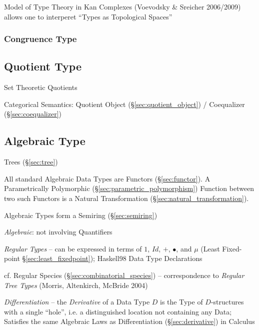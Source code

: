 Model of Type Theory in Kan Complexes (Voevodsky & Sreicher 2006/2009) allows
one to interperet ``Types as Topological Spaces''



\subsubsection{Congruence Type}\label{sec:congruence_type}




\subsection{Quotient Type}\label{sec:quotient_type}\hfill

Set Theoretic Quotients

Categorical Semantics: Quotient Object (\S\ref{sec:quotient_object}) /
Coequalizer (\S\ref{sec:coequalizer})



\subsection{Algebraic Type}\label{sec:algebraic_type}

Trees (\S\ref{sec:tree})

All standard Algebraic Data Types are Functors (\S\ref{sec:functor}). A
Parametrically Polymorphic (\S\ref{sec:parametric_polymorphism}) Function
between two such Functors is a Natural Transformation
(\S\ref{sec:natural_transformation}).

Algebraic Types form a Semiring (\S\ref{sec:semiring})

\emph{Algebraic}: not involving Quantifiers %

\emph{Regular Types} -- can be expressed in terms of $1$, $Id$, $+$, $\bullet$,
and $\mu$ (Least Fixed-point \S\ref{sec:least_fixedpoint}); Haskell98 Data Type
Declarations

cf. Regular Species (\S\ref{sec:combinatorial_species}) -- correspondence to
\emph{Regular Tree Types} (Morris, Altenkirch, McBride 2004)

\emph{Differentiation} -- the \emph{Derivative} of a Data Type $D$ is the
Type of $D$-structures with a single ``hole'', i.e. a distinguished location not
containing any Data;
Satisfies the same Algebraic Laws as Differentiation (\S\ref{sec:derivative}) in
Calculus



